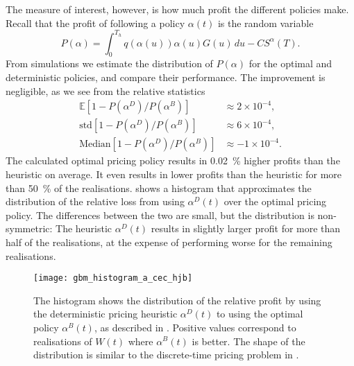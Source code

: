 \documentclass[main.tex]{subfiles}
\begin{document}
\begin{example}
  The measure of interest, however, is how much profit the different
  policies make. Recall that the profit of following a policy
  $\alpha(t)$ is the random variable
  \begin{equation}
    P(\alpha)=\int_0^{T_h}q(\alpha(u))\alpha(u)G(u)\,du-CS^\alpha(T).
  \end{equation}
  From simulations we estimate the distribution of $P(\alpha)$ for the
  optimal and deterministic policies, and compare their performance.
  The improvement is negligible, as we see from the relative statistics
  \begin{align}
    \mathbb{E}\left[1-P(\alpha^D)/P(\alpha^B)\right]
    &\approx 2\times 10^{-4},\\
    \mbox{std}\left[1-P(\alpha^D)/P(\alpha^B)\right]
    &\approx 6\times 10^{-4},\\
    \mbox{Median}\left[1-P(\alpha^D)/P(\alpha^B)\right]
    &\approx -1\times 10^{-4}.
  \end{align}
  The calculated optimal pricing policy results in \SI{0.02}{\percent} higher profits
  than the heuristic on average. It even results in lower profits than the
  heuristic for more than \SI{50}{\percent} of the realisations.
   shows a histogram that approximates
  the distribution of the relative loss from using $\alpha^D(t)$
  over the optimal pricing policy. The differences between the two are
  small, but the distribution is non-symmetric:
  The heuristic $\alpha^D(t)$ results in slightly larger profit for more
  than half of
  the realisations, at the expense of performing  worse for the remaining realisations.
  \begin{figure}[htb]
    \centering
    \texttt{[image: gbm\_histogram\_a\_cec\_hjb]}
    \caption{The histogram shows the distribution of the relative
      profit by using the deterministic pricing heuristic $\alpha^D(t)$
      to using the optimal policy $\alpha^B(t)$, as described in
      . %
      Positive values
      correspond to realisations of $W(t)$ where
      $\alpha^B(t)$ is better.
      The shape of the distribution is similar to the discrete-time pricing problem
      in .
    }\label{fig:gbm_histogram_a_cec_hjb}
  \end{figure}
\end{example}
\end{document}
